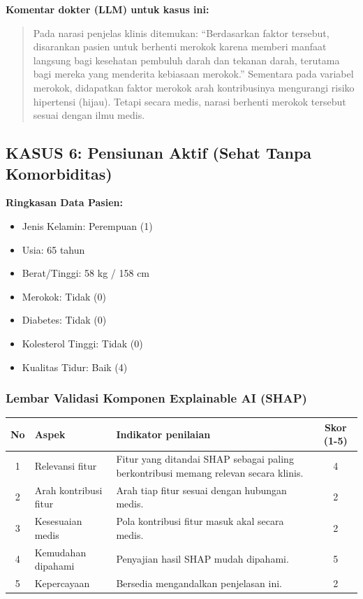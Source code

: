 \textbf{Komentar dokter (LLM) untuk kasus ini:}
\begin{quote}
Pada narasi penjelas klinis ditemukan: ``Berdasarkan faktor tersebut, disarankan pasien untuk berhenti merokok karena memberi manfaat langsung bagi kesehatan pembuluh darah dan tekanan darah, terutama bagi mereka yang menderita kebiasaan merokok.''
Sementara pada variabel merokok, didapatkan faktor merokok arah kontribusinya mengurangi risiko hipertensi (hijau). Tetapi secara medis, narasi berhenti merokok tersebut sesuai dengan ilmu medis.
\end{quote}

\vspace{1.5cm}

\subsection*{KASUS 6: Pensiunan Aktif (Sehat Tanpa Komorbiditas)}
\textbf{Ringkasan Data Pasien:}
\begin{itemize}
    \item Jenis Kelamin: Perempuan (1)
    \item Usia: 65 tahun
    \item Berat/Tinggi: 58 kg / 158 cm
    \item Merokok: Tidak (0)
    \item Diabetes: Tidak (0)
    \item Kolesterol Tinggi: Tidak (0)
    \item Kualitas Tidur: Baik (4)
\end{itemize}

\subsubsection*{Lembar Validasi Komponen Explainable AI (SHAP)}
\begin{center}
\begin{tabular}{|c|p{3.5cm}|p{7.5cm}|c|}
\hline
\textbf{No} & \textbf{Aspek} & \textbf{Indikator penilaian} & \textbf{Skor (1-5)} \\ \hline
1 & Relevansi fitur & Fitur yang ditandai SHAP sebagai paling berkontribusi memang relevan secara klinis. & 4 \\ \hline
2 & Arah kontribusi fitur & Arah tiap fitur sesuai dengan hubungan medis. & 2 \\ \hline
3 & Kesesuaian medis & Pola kontribusi fitur masuk akal secara medis. & 2 \\ \hline
4 & Kemudahan dipahami & Penyajian hasil SHAP mudah dipahami. & 5 \\ \hline
5 & Kepercayaan & Bersedia mengandalkan penjelasan ini. & 2 \\ \hline
\end{tabular}
\end{center}

